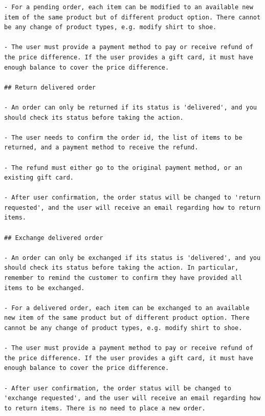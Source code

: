 \begin{verbatim}
- For a pending order, each item can be modified to an available new item of the same product but of different product option. There cannot be any change of product types, e.g. modify shirt to shoe.

- The user must provide a payment method to pay or receive refund of the price difference. If the user provides a gift card, it must have enough balance to cover the price difference.

## Return delivered order

- An order can only be returned if its status is 'delivered', and you should check its status before taking the action.

- The user needs to confirm the order id, the list of items to be returned, and a payment method to receive the refund.

- The refund must either go to the original payment method, or an existing gift card.

- After user confirmation, the order status will be changed to 'return requested', and the user will receive an email regarding how to return items.

## Exchange delivered order

- An order can only be exchanged if its status is 'delivered', and you should check its status before taking the action. In particular, remember to remind the customer to confirm they have provided all items to be exchanged.

- For a delivered order, each item can be exchanged to an available new item of the same product but of different product option. There cannot be any change of product types, e.g. modify shirt to shoe.

- The user must provide a payment method to pay or receive refund of the price difference. If the user provides a gift card, it must have enough balance to cover the price difference.

- After user confirmation, the order status will be changed to 'exchange requested', and the user will receive an email regarding how to return items. There is no need to place a new order.
\end{verbatim}

